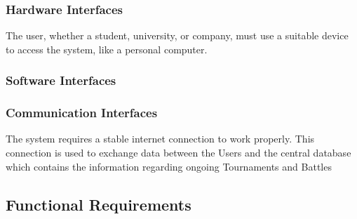 \documentclass{article}
\begin{document}
\subsubsection{Hardware Interfaces}
    The user, whether a student, university, or company, must use a suitable device to access the system, like a personal computer.
\subsubsection{Software Interfaces}

\subsubsection{Communication Interfaces}
    The system requires a stable internet connection to work properly. This connection is used
    to exchange data between the Users and the central database which contains the information
regarding ongoing Tournaments and Battles
\subsection{Functional Requirements}
\end{document}
